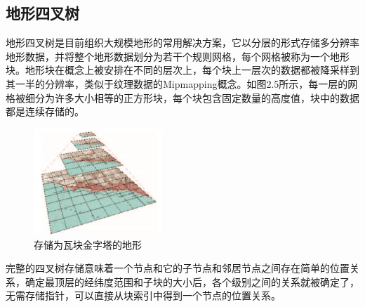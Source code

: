 \subsection{地形四叉树}
地形四叉树是目前组织大规模地形的常用解决方案，它以分层的形式存储多分辨率地形数据，并将整个地形数据划分为若干个规则网格，每个网格被称为一个地形块。地形块在概念上被安排在不同的层次上，每个块上一层次的数据都被降采样到其一半的分辨率，类似于纹理数据的Mipmapping概念。如图2.5所示，每一层的网格被细分为许多大小相等的正方形块，每个块包含固定数量的高度值，块中的数据都是连续存储的。\par
\begin{figure}[H]
    \centering
    \includegraphics[height=4cm,width=4.8cm]{figures/quadtree.jpg}
    \caption{存储为瓦块金字塔的地形\supercite{PlatingsCompression}}
\end{figure}
完整的四叉树存储意味着一个节点和它的子节点和邻居节点之间存在简单的位置关系，确定最顶层的经纬度范围和子块的大小后，各个级别之间的关系就被确定了，无需存储指针，可以直接从块索引中得到一个节点的位置关系。\par

